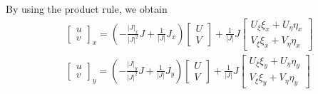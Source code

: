 \documentclass[final,1p,times]{elsarticle}
\begin{document}
By using the product rule, we obtain
\begin{subequations}
\begin{align}
&\begin{bmatrix} u \\ v \end{bmatrix}_x = \left(-\frac{|J|_x}{|J|^2}J+\frac{1}{|J|}J_x\right)\begin{bmatrix} U \\ V \end{bmatrix} + \frac{1}{|J|}J\begin{bmatrix} U_{\xi}\xi_x+U_{\eta}\eta_x \\ V_{\xi}\xi_x+V_{\eta}\eta_x \end{bmatrix} \\
&\begin{bmatrix} u \\ v \end{bmatrix}_y = \left(-\frac{|J|_y}{|J|^2}J+\frac{1}{|J|}J_y\right)\begin{bmatrix} U \\ V \end{bmatrix} + \frac{1}{|J|}J\begin{bmatrix} U_{\xi}\xi_y+U_{\eta}\eta_y \\ V_{\xi}\xi_y+V_{\eta}\eta_y \end{bmatrix}
\end{align}
\end{subequations}
\end{document}
